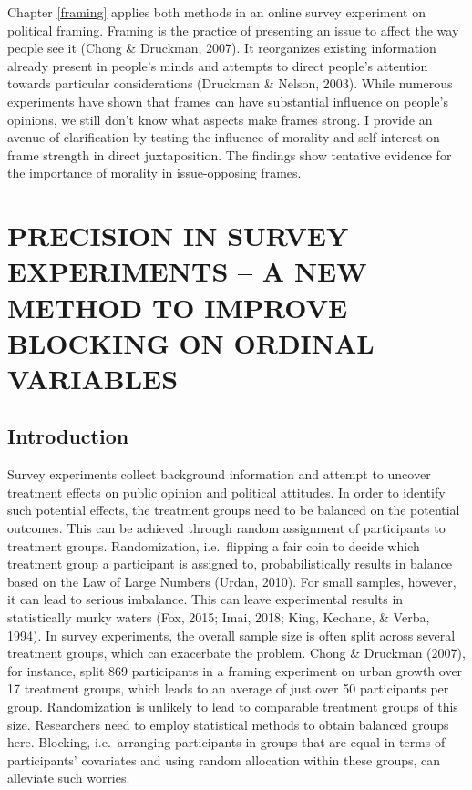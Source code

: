 \documentclass[12pt,econ]{sources/authesis}
\begin{document}
Chapter \ref{framing} applies both methods in an online survey experiment on political framing. Framing is the practice of presenting an issue to affect the way people see it (Chong \& Druckman, 2007). It reorganizes existing information already present in people's minds and attempts to direct people's attention towards particular considerations (Druckman \& Nelson, 2003). While numerous experiments have shown that frames can have substantial influence on people's opinions, we still don't know what aspects make frames strong. I provide an avenue of clarification by testing the influence of morality and self-interest on frame strength in direct juxtaposition. The findings show tentative evidence for the importance of morality in issue-opposing frames.

\hypertarget{ordblock}{%
\chapter{PRECISION IN SURVEY EXPERIMENTS -- A NEW METHOD TO IMPROVE BLOCKING ON ORDINAL VARIABLES}\label{ordblock}}

\hypertarget{ordblock-intro}{%
\section{Introduction}\label{ordblock-intro}}

Survey experiments collect background information and attempt to uncover treatment effects on public opinion and political attitudes. In order to identify such potential effects, the treatment groups need to be balanced on the potential outcomes. This can be achieved through random assignment of participants to treatment groups. Randomization, i.e.~flipping a fair coin to decide which treatment group a participant is assigned to, probabilistically results in balance based on the Law of Large Numbers (Urdan, 2010). For small samples, however, it can lead to serious imbalance. This can leave experimental results in statistically murky waters (Fox, 2015; Imai, 2018; King, Keohane, \& Verba, 1994). In survey experiments, the overall sample size is often split across several treatment groups, which can exacerbate the problem. Chong \& Druckman (2007), for instance, split 869 participants in a framing experiment on urban growth over 17 treatment groups, which leads to an average of just over 50 participants per group. Randomization is unlikely to lead to comparable treatment groups of this size. Researchers need to employ statistical methods to obtain balanced groups here. Blocking, i.e.~arranging participants in groups that are equal in terms of participants' covariates and using random allocation within these groups, can alleviate such worries.
\end{document}
